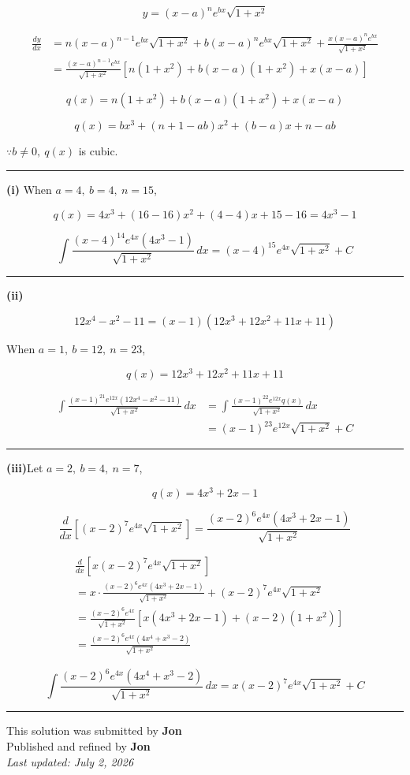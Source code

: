 \documentclass[12pt]{article}
\begin{document}
\newcommand{\ds}{\displaystyle}

$$y=(x-a)^ne^{bx}\sqrt{1+x^2}$$

\begin{align*}
\frac{dy}{dx}
&=n(x-a)^{n-1}e^{bx}\sqrt{1+x^2}
+b(x-a)^ne^{bx}\sqrt{1+x^2}
+\frac{x(x-a)^ne^{bx}}{\sqrt{1+x^2}}\\
&=\frac{(x-a)^{n-1}e^{bx}}{\sqrt{1+x^2}}
\left[n(1+x^2)+b(x-a)(1+x^2)+x(x-a)\right]
\end{align*}

$$q(x)=n(1+x^2)+b(x-a)(1+x^2)+x(x-a)$$

$$q(x)=bx^3+(n+1-ab)x^2+(b-a)x+n-ab$$

$\because b\neq 0,\ q(x)$ is cubic.

\bigskip\hrule\bigskip

\textbf{(i)} When $\ds a=4,\ b=4,\ n=15$,

$$q(x)=4x^3+(16-16)x^2+(4-4)x+15-16=4x^3-1$$

$$\int \frac{(x-4)^{14}e^{4x}(4x^3-1)}{\sqrt{1+x^2}}\,dx
=(x-4)^{15}e^{4x}\sqrt{1+x^2}+C$$

\bigskip\hrule\bigskip

\textbf{(ii)}

$$12x^4-x^2-11=(x-1)(12x^3+12x^2+11x+11)$$

When $\ds a=1,\ b=12,\ n=23$,

$$q(x)=12x^3+12x^2+11x+11$$

\begin{align*}
\int \frac{(x-1)^{21}e^{12x}(12x^4-x^2-11)}{\sqrt{1+x^2}}\,dx
&=\int \frac{(x-1)^{22}e^{12x}q(x)}{\sqrt{1+x^2}}\,dx\\
&=(x-1)^{23}e^{12x}\sqrt{1+x^2}+C
\end{align*}

\bigskip\hrule\bigskip
\textbf{(iii)}Let $\ds a=2,\ b=4,\ n=7$,

$$q(x)=4x^3+2x-1$$

$$\frac{d}{dx}\left[(x-2)^7e^{4x}\sqrt{1+x^2}\right]
=\frac{(x-2)^6e^{4x}(4x^3+2x-1)}{\sqrt{1+x^2}}$$

\begin{align*}
&\frac{d}{dx}\left[x(x-2)^7e^{4x}\sqrt{1+x^2}\right]\\
&=x\cdot \frac{(x-2)^6e^{4x}(4x^3+2x-1)}{\sqrt{1+x^2}}
+(x-2)^7e^{4x}\sqrt{1+x^2}\\
&=\frac{(x-2)^6e^{4x}}{\sqrt{1+x^2}}
\left[x(4x^3+2x-1)+(x-2)(1+x^2)\right]\\
&=\frac{(x-2)^6e^{4x}(4x^4+x^3-2)}{\sqrt{1+x^2}}
\end{align*}

$$\int \frac{(x-2)^6e^{4x}(4x^4+x^3-2)}{\sqrt{1+x^2}}\,dx
=x(x-2)^7e^{4x}\sqrt{1+x^2}+C$$

\bigskip
\hrule
\begin{center}
    This solution was submitted by \textbf{Jon}\\[4pt]
    Published and refined by \textbf{Jon}\\[8pt]
    \textit{Last updated: July 2, 2026}
\end{center}
\end{document}

